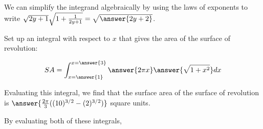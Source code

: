 \documentclass{ximera}
\begin{document}
\begin{exercise}
\begin{exercise}
\begin{hint}
We can simplify the integrand algebraically by using the laws of exponents to write $\sqrt{2y+1} \sqrt{1+ \frac{1}{2y+1}} =\sqrt{\answer{2y+2}}$. 
\end{hint}

\end{exercise}



Set up an integral with respect to $x$ that gives the area of the surface of revolution:  

\[
SA=\int_{x=\answer{1}}^{x=\answer{3}} \answer{2 \pi x} \answer{ \sqrt{1+ x^2}} dx
\]



\begin{exercise}
Evaluating this integral, we find that the surface area of the surface of revolution is $\answer{\frac{2\pi}{3} ((10)^{3/2} -(2)^{3/2})}$ square units. 

\end{exercise}

By evaluating both of these integrals, 
\begin{multipleChoice}
\end{multipleChoice}

\end{exercise}
\end{document}
